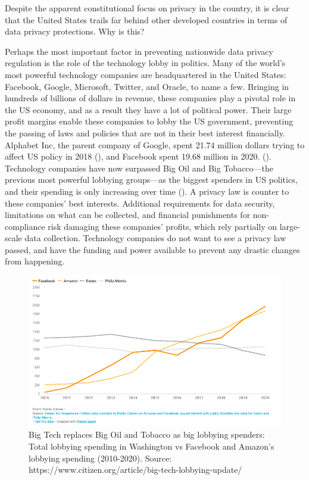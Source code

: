 \documentclass[water,article,submit,moreauthors,pdftex]{mdpi}
\begin{document}
Despite the apparent constitutional focus on privacy in the country, it
is clear that the United States trails far behind other developed
countries in terms of data privacy protections. Why is this?

Perhaps the most important factor in preventing nationwide data privacy
regulation is the role of the technology lobby in politics. Many of the
world's most powerful technology companies are headquartered in the
United States: Facebook, Google, Microsoft, Twitter, and Oracle, to name
a few. Bringing in hundreds of billions of dollars in revenue, these
companies play a pivotal role in the US economy, and as a result they
have a lot of political power. Their large profit margins enable these
companies to lobby the US government, preventing the passing of laws and
policies that are not in their best interest financially. Alphabet Inc,
the parent company of Google, spent 21.74 million dollars trying to
affect US policy in 2018 (\citet{tech-lobby}), and Facebook spent 19.68
million in 2020. (\citet{citizen-tech}). Technology companies have now
surpassed Big Oil and Big Tobacco---the previous most powerful lobbying
groups---as the biggest spenders in US politics, and their spending is
only increasing over time (\citet{citizen-tech}). A privacy law is
counter to these companies' best interests. Additional requirements for
data security, limitations on what can be collected, and financial
punishments for non-compliance risk damaging these companies' profits,
which rely partially on large-scale data collection. Technology
companies do not want to see a privacy law passed, and have the funding
and power available to prevent any drastic changes from happening.

\begin{figure}[H]
\includegraphics[width=1\linewidth]{lobby-notitle} \caption{Big Tech replaces Big Oil and Tobacco as big lobbying spenders: Total lobbying spending in Washington vs Facebook and Amazon's lobbying spending (2010-2020). Source: https://www.citizen.org/article/big-tech-lobbying-update/}\label{fig:unnamed-chunk-1}
\end{figure}
\end{document}
